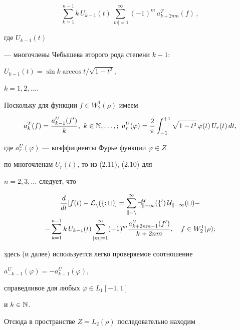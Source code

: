 \begin{pf}
\begin{equation}
\sum_{k=1}^{n-1} k\, U_{k-1}(t)\sum_{|m|=1}^\infty (-1)^m\,


a^T_{k+2nm}(f)\, ,


\end{equation}


где $U_{k-1}(t)$


--- многочлены Чебышева второго рода степени $k-1$:


$U_{k-1}(t)=\sin k \arccos t/\sqrt{1-t^2}$,


$k=1, 2, \dotsc $.





Поскольку для функции $f\in W_2^1(\rho )$ имеем


\begin{equation}


a_k^T(f)=\frac{a_{k-1}^U(f')}{k}, \ k\in \Bbb{N},\dotsc,; \


a_r^U(\varphi )=\frac{2}{\pi}\int_{-1}^{+1}


\sqrt{1-t^2}\, \varphi (t)\, U_r(t)\, dt,


\end{equation}


где $a_r^U(\varphi )$ --- коэффициенты Фурье функции $\varphi\in Z$


по многочленам $U_r(t)$, то из (2.11), (2.10) для


$n=2,3,\dotsc $ следует, что


\begin{gather}


\frac{d}{dt}[f(t)-\cal{L}_n(f;t)]=


\sum_{k=n}^\infty a_{k-1}^U(f') \, U_{k-1}(t) -\notag\\


%


-\sum_{k=1}^{n-1} k\, U_{k-1}(t)\sum_{|m|=1}^\infty (-1)^m


\frac{a^U_{k+2nm-1}(f')}{k+2nm},\quad f\in W_2^1(\rho ) ;


\end{gather}


здесь (и далее) используется легко проверяемое соотношение


$a^U_{-k-1}(\varphi )=-a^U_{k-1}(\varphi )$,


справедливое для любых $\varphi\in L_1[-1,1]$


и $k\in \Bbb{N}$.


Отсюда в пространстве $Z=L_2(\rho )$ последовательно находим


\begin{gather}



\end{gather}
\end{pf}
